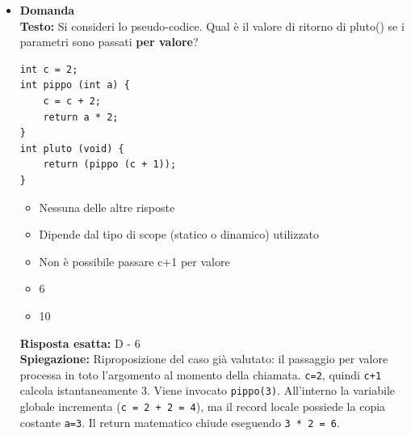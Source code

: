\documentclass[12pt, a4paper]{article}
\newcounter{domandateoria}
\begin{document}
\begin{itemize}
    \item {}\textbf{Domanda \thedomandateoria} \\
    \textbf{Testo:} Si consideri lo pseudo-codice. Qual è il valore di ritorno di pluto() se i parametri sono passati \textbf{per valore}?
\begin{verbatim}
int c = 2;
int pippo (int a) {
    c = c + 2;
    return a * 2;
}
int pluto (void) {
    return (pippo (c + 1));
}
\end{verbatim}
    \begin{itemize}
        \item[A)] Nessuna delle altre risposte
        \item[B)] Dipende dal tipo di scope (statico o dinamico) utilizzato
        \item[C)] Non è possibile passare c+1 per valore
        \item[D)] 6
        \item[E)] 10
    \end{itemize}
    \textbf{Risposta esatta:} D - 6 \\
    \textbf{Spiegazione:} Riproposizione del caso già valutato: il passaggio per valore processa in toto l'argomento al momento della chiamata. \texttt{c=2}, quindi \texttt{c+1} calcola istantaneamente 3. Viene invocato \texttt{pippo(3)}. All'interno la variabile globale incrementa (\texttt{c = 2 + 2 = 4}), ma il record locale possiede la copia costante \texttt{a=3}. Il return matematico chiude eseguendo \texttt{3 * 2 = 6}.
    \vspace{0.3cm}
\end{itemize}
\end{document}

